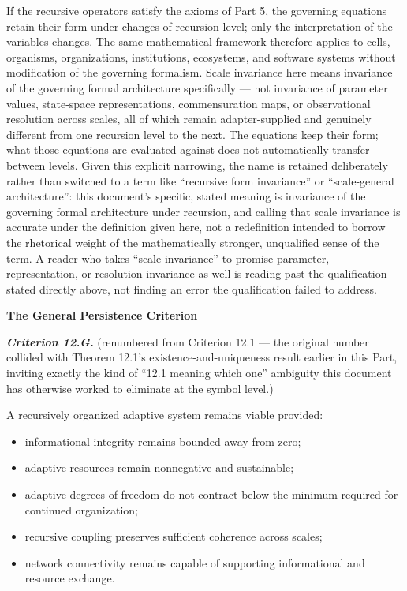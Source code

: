 \documentclass[
]{article}
\begin{document}
If the recursive operators satisfy the axioms of Part 5, the governing
equations retain their form under changes of recursion level; only the
interpretation of the variables changes. The same mathematical framework
therefore applies to cells, organisms, organizations, institutions,
ecosystems, and software systems without modification of the governing
formalism. Scale invariance here means invariance of the governing
formal architecture specifically --- not invariance of parameter values,
state-space representations, commensuration maps, or observational
resolution across scales, all of which remain adapter-supplied and
genuinely different from one recursion level to the next. The equations
keep their form; what those equations are evaluated against does not
automatically transfer between levels. Given this explicit narrowing,
the name is retained deliberately rather than switched to a term like
``recursive form invariance'' or ``scale-general architecture'': this
document's specific, stated meaning is invariance of the governing
formal architecture under recursion, and calling that scale invariance
is accurate under the definition given here, not a redefinition intended
to borrow the rhetorical weight of the mathematically stronger,
unqualified sense of the term. A reader who takes ``scale invariance''
to promise parameter, representation, or resolution invariance as well
is reading past the qualification stated directly above, not finding an
error the qualification failed to address.

\textbf{The General Persistence Criterion}

\emph{\textbf{Criterion 12.G.}} (renumbered from Criterion 12.1 --- the
original number collided with Theorem 12.1's existence-and-uniqueness
result earlier in this Part, inviting exactly the kind of ``12.1 meaning
which one'' ambiguity this document has otherwise worked to eliminate at
the symbol level.)

A recursively organized adaptive system remains viable provided:

\begin{itemize}
\item
  informational integrity remains bounded away from zero;
\item
  adaptive resources remain nonnegative and sustainable;
\item
  adaptive degrees of freedom do not contract below the minimum required
  for continued organization;
\item
  recursive coupling preserves sufficient coherence across scales;
\item
  network connectivity remains capable of supporting informational and
  resource exchange.
\end{itemize}
\end{document}
